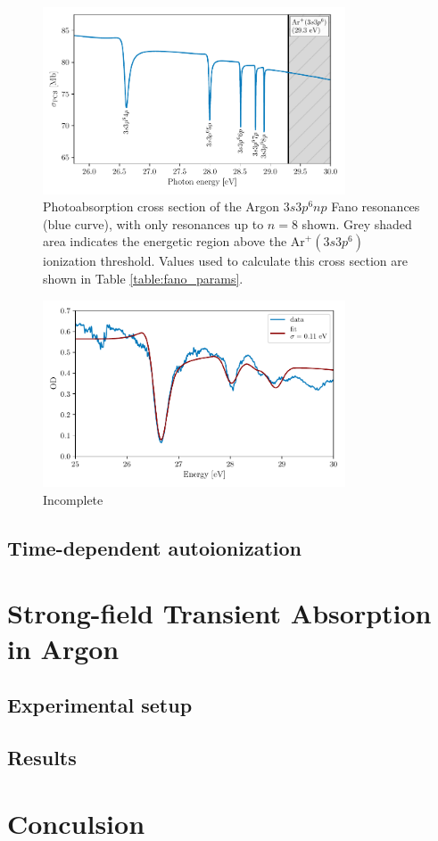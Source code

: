 \begin{figure}
	\centering
	\includegraphics[width=0.8\textwidth]{figures/ATS/fano_GS.pdf}
	\caption{Photoabsorption cross section of the Argon $3s3p^6np$ Fano resonances (blue curve), with only resonances up to $n=8$ shown.  Grey shaded area indicates the energetic region above the $\mathrm{Ar}^+(3s3p^6)$ ionization threshold. Values used to calculate this cross section are shown in Table \ref{table:fano_params}.}
	\label{fig:fano_gs_pcs}
\end{figure}

\begin{figure}
	\centering
	\includegraphics[width=0.8\textwidth]{figures/ATS/fano_fit.pdf}
	\caption{Incomplete}
	\label{fig:fano_fit}
\end{figure}

\subsection{Time-dependent autoionization}

\section{Strong-field Transient Absorption in Argon}
\label{sec:ATS_ar}

\subsection{Experimental setup}
\label{sec:ATS_ar_exp_setup}

\subsection{Results}
\label{sec:ATS_ar_results}

\section{Conculsion}
\label{sec:ATS_conclusion}

